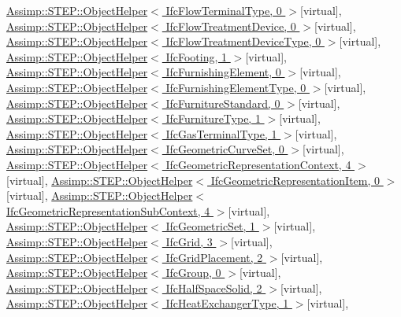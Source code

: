 \hyperlink{struct_assimp_1_1_s_t_e_p_1_1_object_helper}{Assimp\+::\+S\+T\+E\+P\+::\+Object\+Helper$<$ Ifc\+Flow\+Terminal\+Type, 0 $>$}{\ttfamily  \mbox{[}virtual\mbox{]}}, \hyperlink{struct_assimp_1_1_s_t_e_p_1_1_object_helper}{Assimp\+::\+S\+T\+E\+P\+::\+Object\+Helper$<$ Ifc\+Flow\+Treatment\+Device, 0 $>$}{\ttfamily  \mbox{[}virtual\mbox{]}}, \hyperlink{struct_assimp_1_1_s_t_e_p_1_1_object_helper}{Assimp\+::\+S\+T\+E\+P\+::\+Object\+Helper$<$ Ifc\+Flow\+Treatment\+Device\+Type, 0 $>$}{\ttfamily  \mbox{[}virtual\mbox{]}}, \hyperlink{struct_assimp_1_1_s_t_e_p_1_1_object_helper}{Assimp\+::\+S\+T\+E\+P\+::\+Object\+Helper$<$ Ifc\+Footing, 1 $>$}{\ttfamily  \mbox{[}virtual\mbox{]}}, \hyperlink{struct_assimp_1_1_s_t_e_p_1_1_object_helper}{Assimp\+::\+S\+T\+E\+P\+::\+Object\+Helper$<$ Ifc\+Furnishing\+Element, 0 $>$}{\ttfamily  \mbox{[}virtual\mbox{]}}, \hyperlink{struct_assimp_1_1_s_t_e_p_1_1_object_helper}{Assimp\+::\+S\+T\+E\+P\+::\+Object\+Helper$<$ Ifc\+Furnishing\+Element\+Type, 0 $>$}{\ttfamily  \mbox{[}virtual\mbox{]}}, \hyperlink{struct_assimp_1_1_s_t_e_p_1_1_object_helper}{Assimp\+::\+S\+T\+E\+P\+::\+Object\+Helper$<$ Ifc\+Furniture\+Standard, 0 $>$}{\ttfamily  \mbox{[}virtual\mbox{]}}, \hyperlink{struct_assimp_1_1_s_t_e_p_1_1_object_helper}{Assimp\+::\+S\+T\+E\+P\+::\+Object\+Helper$<$ Ifc\+Furniture\+Type, 1 $>$}{\ttfamily  \mbox{[}virtual\mbox{]}}, \hyperlink{struct_assimp_1_1_s_t_e_p_1_1_object_helper}{Assimp\+::\+S\+T\+E\+P\+::\+Object\+Helper$<$ Ifc\+Gas\+Terminal\+Type, 1 $>$}{\ttfamily  \mbox{[}virtual\mbox{]}}, \hyperlink{struct_assimp_1_1_s_t_e_p_1_1_object_helper}{Assimp\+::\+S\+T\+E\+P\+::\+Object\+Helper$<$ Ifc\+Geometric\+Curve\+Set, 0 $>$}{\ttfamily  \mbox{[}virtual\mbox{]}}, \hyperlink{struct_assimp_1_1_s_t_e_p_1_1_object_helper}{Assimp\+::\+S\+T\+E\+P\+::\+Object\+Helper$<$ Ifc\+Geometric\+Representation\+Context, 4 $>$}{\ttfamily  \mbox{[}virtual\mbox{]}}, \hyperlink{struct_assimp_1_1_s_t_e_p_1_1_object_helper}{Assimp\+::\+S\+T\+E\+P\+::\+Object\+Helper$<$ Ifc\+Geometric\+Representation\+Item, 0 $>$}{\ttfamily  \mbox{[}virtual\mbox{]}}, \hyperlink{struct_assimp_1_1_s_t_e_p_1_1_object_helper}{Assimp\+::\+S\+T\+E\+P\+::\+Object\+Helper$<$ Ifc\+Geometric\+Representation\+Sub\+Context, 4 $>$}{\ttfamily  \mbox{[}virtual\mbox{]}}, \hyperlink{struct_assimp_1_1_s_t_e_p_1_1_object_helper}{Assimp\+::\+S\+T\+E\+P\+::\+Object\+Helper$<$ Ifc\+Geometric\+Set, 1 $>$}{\ttfamily  \mbox{[}virtual\mbox{]}}, \hyperlink{struct_assimp_1_1_s_t_e_p_1_1_object_helper}{Assimp\+::\+S\+T\+E\+P\+::\+Object\+Helper$<$ Ifc\+Grid, 3 $>$}{\ttfamily  \mbox{[}virtual\mbox{]}}, \hyperlink{struct_assimp_1_1_s_t_e_p_1_1_object_helper}{Assimp\+::\+S\+T\+E\+P\+::\+Object\+Helper$<$ Ifc\+Grid\+Placement, 2 $>$}{\ttfamily  \mbox{[}virtual\mbox{]}}, \hyperlink{struct_assimp_1_1_s_t_e_p_1_1_object_helper}{Assimp\+::\+S\+T\+E\+P\+::\+Object\+Helper$<$ Ifc\+Group, 0 $>$}{\ttfamily  \mbox{[}virtual\mbox{]}}, \hyperlink{struct_assimp_1_1_s_t_e_p_1_1_object_helper}{Assimp\+::\+S\+T\+E\+P\+::\+Object\+Helper$<$ Ifc\+Half\+Space\+Solid, 2 $>$}{\ttfamily  \mbox{[}virtual\mbox{]}}, \hyperlink{struct_assimp_1_1_s_t_e_p_1_1_object_helper}{Assimp\+::\+S\+T\+E\+P\+::\+Object\+Helper$<$ Ifc\+Heat\+Exchanger\+Type, 1 $>$}{\ttfamily  \mbox{[}virtual\mbox{]}}, 